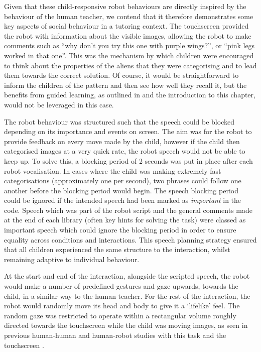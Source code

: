 Given that these child-responsive robot behaviours are directly inspired by the behaviour of the human teacher, we contend that it therefore demonstrates some key aspects of social behaviour in a tutoring context. The touchscreen provided the robot with information about the visible images, allowing the robot to make comments such as ``why don't you try this one with purple wings?'', or ``pink legs worked in that one''. This was the mechanism by which children were encouraged to think about the properties of the aliens that they were categorising and to lead them towards the correct solution. Of course, it would be straightforward to inform the children of the pattern and then see how well they recall it, but the benefits from guided learning, as outlined in \cite{kuhlthau2007guided, merrill1995tutoring} and the introduction to this chapter, would not be leveraged in this case.

The robot behaviour was structured such that the speech could be blocked depending on its importance and events on screen. The aim was for the robot to provide feedback on every move made by the child, however if the child then categorised images at a very quick rate, the robot speech would not be able to keep up. To solve this, a blocking period of 2 seconds was put in place after each robot vocalisation. In cases where the child was making extremely fast categorisations (approximately one per second), two phrases could follow one another before the blocking period would begin. The speech blocking period could be ignored if the intended speech had been marked as \textit{important} in the code. Speech which was part of the robot script and the general comments made at the end of each library (often key hints for solving the task) were classed as important speech which could ignore the blocking period in order to ensure equality across conditions and interactions. This speech planning strategy ensured that all children experienced the same structure to the interaction, whilst remaining adaptive to individual behaviour.

At the start and end of the interaction, alongside the scripted speech, the robot would make a number of predefined gestures and gaze upwards, towards the child, in a similar way to the human teacher. For the rest of the interaction, the robot would randomly move its head and body to give it a `lifelike' feel. The random gaze was restricted to operate within a rectangular volume roughly directed towards the touchscreen while the child was moving images, as seen in previous human-human and human-robot studies with this task and the touchscreen \citep{baxter2013emergence, kennedy2013constraining}.

